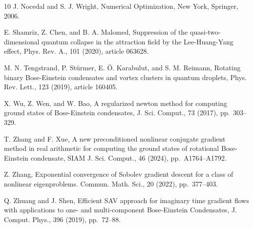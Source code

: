 \documentclass[preprint,3p]{elsarticle}
\begin{document}
\begin{thebibliography}{10}
	{ J. Nocedal and S. J. Wright}, { Numerical Optimization}, New York, Springer, 2006.
	
	{ E. Shamriz, Z. Chen, and B. A. Malomed}, { Suppression of the quasi-two-dimensional quantum collapse in the attraction field by the Lee-Huang-Yang effect}, Phys. Rev. A., 101 (2020), article 063628.
	
	{ M. N. Tengstrand, P. St\"urmer, E. \"O. Karabulut, and S. M. Reimann}, { Rotating binary Bose-Einstein condensates and vortex clusters in quantum droplets}, Phys. Rev. Lett., 123 (2019), article 160405. 
	
	{ X. Wu, Z. Wen, and W. Bao}, { A regularized newton method for
		computing ground states of {B}ose-{E}instein condensates}, J. Sci. Comput.,
	73 (2017), pp.~303--329.
	
	{ T. Zhang and F. Xue}, { A new preconditioned nonlinear conjugate gradient method in real arithmetic for computing the ground states of rotational Bose-Einstein condensate}, SIAM J. Sci. Comput., 46 (2024), pp.~A1764--A1792.
	
	{ Z. Zhang}, { Exponential convergence of Sobolev gradient descent for a class of nonlinear eigenproblems}. Commun. Math. Sci., 20 (2022), pp.~377--403.
	
	{ Q. Zhuang and J. Shen}, { Efficient {SAV} approach for imaginary time
		gradient flows with applications to one- and multi-component {B}ose-{E}instein {C}ondensates}, J. Comput. Phys.,
	396 (2019), pp.~72--88.
	
	
	
	
\end{thebibliography}
\end{document}
